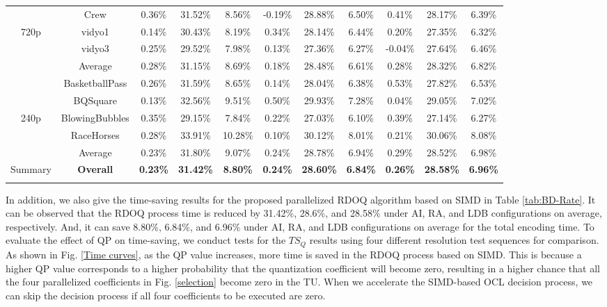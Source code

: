 \documentclass[lettersize,journal]{IEEEtran}
\begin{document}
\begin{table}[!h]
\begin{tabular}{c | c | c   c   c | c   c   c | c   c   c }
	           & Crew           & 0.36\% & 31.52\% & 8.56\% &-0.19\% & 28.88\% & 6.50\% & 0.41\% & 28.17\% & 6.39\% \\  
	     720p  & vidyo1         & 0.14\% & 30.43\% & 8.19\% & 0.34\% & 28.14\% & 6.44\% & 0.20\% & 27.35\% & 6.32\% \\             
	           & vidyo3         & 0.25\% & 29.52\% & 7.98\% & 0.13\% & 27.36\% & 6.27\% &-0.04\% & 27.64\% & 6.46\% \\   
	    \cmidrule[0.75pt]{2-11} 
	           & Average        & 0.28\% & 31.15\% & 8.69\% & 0.18\% & 28.48\% & 6.61\% & 0.28\% & 28.32\% & 6.82\% \\ 
	    \cmidrule[0.75pt]{1-11}  
	           & BasketballPass & 0.26\% & 31.59\% & 8.65\% & 0.14\% & 28.04\% & 6.38\% & 0.53\% & 27.82\% & 6.53\% \\          
	           & BQSquare       & 0.13\% & 32.56\% & 9.51\% & 0.50\% & 29.93\% & 7.28\% & 0.04\% & 29.05\% & 7.02\% \\  
	     240p  & BlowingBubbles & 0.35\% & 29.15\% & 7.84\% & 0.22\% & 27.03\% & 6.10\% & 0.39\% & 27.14\% & 6.27\% \\             
	           & RaceHorses     & 0.28\% & 33.91\% &10.28\% & 0.10\% & 30.12\% & 8.01\% & 0.21\% & 30.06\% & 8.08\% \\   
	    \cmidrule[0.75pt]{2-11} 
	           & Average        & 0.23\% & 31.80\% & 9.07\% & 0.24\% & 28.78\% & 6.94\% & 0.29\% & 28.52\% & 6.98\% \\ 
	    \cmidrule[0.75pt]{1-11} 
	    Summary & \textbf{Overall} & \textbf{0.23\%} & \textbf{31.42\%} & \textbf{8.80\%} & \textbf{0.24\%} & \textbf{28.60\%} & \textbf{6.84\%} & \textbf{0.26\%} & \textbf{28.58\%} & \textbf{6.96\%} \\ 
		\midrule[0.75pt] \specialrule{0em}{0.35pt}{0.35pt} \midrule[0.75pt] %
	\end{tabular}
\end{table}

In addition, we also give the time-saving results for the proposed parallelized RDOQ algorithm based on SIMD in Table \ref{tab:BD-Rate}. It can be observed that the RDOQ process time is reduced by 31.42\%, 28.6\%, and 28.58\% under AI, RA, and LDB configurations on average, respectively. And, it can save 8.80\%, 6.84\%, and 6.96\% under AI, RA, and LDB configurations on average for the total encoding time. To evaluate the effect of QP on time-saving, we conduct tests for the $TS_{Q}$ results using four different resolution test sequences for comparison. As shown in Fig. \ref{Time curves}, as the QP value increases, more time is saved in the RDOQ process based on SIMD. This is because a higher QP value corresponds to a higher probability that the quantization coefficient will become zero, resulting in a higher chance that all the four parallelized coefficients in Fig. \ref{selection} become zero in the TU. When we accelerate the SIMD-based OCL decision process, we can skip the decision process if all four coefficients to be executed are zero. 
\end{document}
